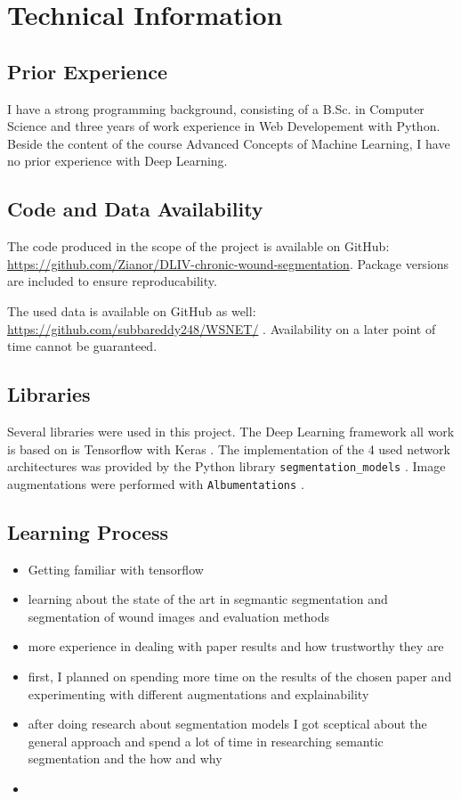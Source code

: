\section{Technical Information}

\subsection{Prior Experience}

I have a strong programming background, consisting of a B.Sc. in Computer Science and three years of work experience in Web Developement with Python. Beside the content of the course Advanced Concepts of Machine Learning, I have no prior experience with Deep Learning.

\subsection{Code and Data Availability}

The code produced in the scope of the project is available on GitHub: \url{https://github.com/Zianor/DLIV-chronic-wound-segmentation}. Package versions are included to ensure reproducability.

The used data is available on GitHub as well: \url{https://github.com/subbareddy248/WSNET/} \cite{Oota_2021_WACV, Oota_2023_WACV}. Availability on a later point of time cannot be guaranteed.

\subsection{Libraries}

Several libraries were used in this project. The Deep Learning framework all work is based on is Tensorflow with Keras \cite{tensorflow2015-whitepaper, chollet2015keras}. The implementation of the 4 used network architectures was provided by the Python library \texttt{segmentation\_models} \cite{SegmentationModels}. Image augmentations were performed with \texttt{Albumentations} \cite{albumentations}.

\subsection{Learning Process}

\begin{itemize}
	\item Getting familiar with tensorflow
	\item learning about the state of the art in segmantic segmentation and segmentation of wound images and evaluation methods
	\item more experience in dealing with paper results and how trustworthy they are
	\item first, I planned on spending more time on the results of the chosen paper and experimenting with different augmentations and explainability
	\item after doing research about segmentation models I got sceptical about the general approach and spend a lot of time in researching semantic segmentation and the how and why
	\item 
\end{itemize}


